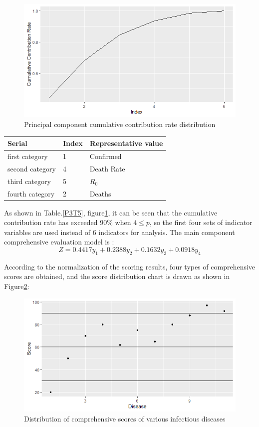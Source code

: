 \documentclass[a4paper, 11pt,twoside=true]{scrartcl}
\begin{document}
\begin{figure}[h]
	\small
	\centering
	\includegraphics[width=12cm]{P3F5}
	\caption{Principal component cumulative contribution rate distribution} \label{P3F5}
\end{figure}
\begin{table}[]
	\centering
	\begin{tabular}{lll}
		\hline
		\textbf{Serial} & \textbf{Index} & \textbf{Representative value} \\ \hline
         first category        & 1           & Confirmed           \\
         second category        & 4           & Death Rate            \\
         third category        & 5           & $R_0$             \\
         fourth category       & 2           & Deaths           \\ \hline
	\end{tabular}
\end{table}

\quad As shown in Table.\ref{P3T5}, figure\ref{P3F5}, it can be seen that the cumulative contribution rate has exceeded 90\% when $4\leq p$, so the first four sets of indicator variables are used instead of 6 indicators for analysis. The main component comprehensive evaluation model is :
$$
Z=0.4417y_1+0.2388y_2+0.1632y_3+0.0918y_4
$$

\quad According to the normalization of the scoring results, four types of comprehensive scores are obtained, and the score distribution chart is drawn as shown in Figure\ref{P3F6}:
\begin{figure}[H]
	\small
	\centering
	\includegraphics[width=12cm]{P3F6}
	\caption{Distribution of comprehensive scores of various infectious diseases} \label{P3F6}
\end{figure}
\end{document}
